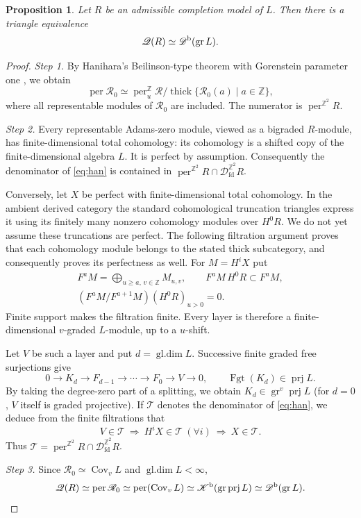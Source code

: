\documentclass[12pt,a4paper,english,reqno]{amsart}
\theoremstyle{plain}
\newtheorem{prp}[thm]{Proposition}
\theoremstyle{definition}
\numberwithin{equation}{section}
\def\prj{\operatorname{prj}}
\def\thick{\operatorname{thick}}
\def\Kb{{\mathcal K}^{\text{\rm b}}}
\def\Db{{\mathcal D}^{\text{\rm b}}}
\def\perf{\operatorname{per}}
\def\calD{{\mathcal D}}
\def\bbZ{{\mathbb Z}}
\def\Ds{\bigoplus}
\newcommand{\Fgt}{\operatorname{Fgt}}
\def\gr{\operatorname{gr}}
\def\Cov{\operatorname{Cov}}
\def\fd{\mathrm{fd}}
\begin{document}
\begin{prp}\label{prop:cover}
Let $R$ be an admissible completion model of $L$.
Then there is a triangle equivalence
\[
 \mathcal Q(R)\simeq\Db(\gr L).
\]
\end{prp}
\begin{proof}
\emph{Step 1.}
By Hanihara's Beilinson-type theorem with Gorenstein parameter one \cite[Theorem A.7]{Han}, we obtain
\begin{equation}\label{eq:han}
 \perf\mathcal R_0\simeq
 \perf^{\bbZ}_u\mathcal R/
 \thick\{\mathcal R_0(a)\mid a\in\bbZ\},
\end{equation}
where all representable modules of $\mathcal R_0$ are included. The numerator is $\perf^{\bbZ^2}R$. 

\medskip\noindent\emph{Step 2.}
Every representable Adams-zero module, viewed as a bigraded $R$-module, has finite-dimensional total cohomology: its cohomology is a shifted copy of the finite-dimensional algebra $L$. It is perfect by assumption. Consequently the denominator of \eqref{eq:han} is contained in $\perf^{\bbZ^2}R\cap\calD_{\fd}^{\bbZ^2}R$.

Conversely, let $X$ be perfect with finite-dimensional total cohomology. In the ambient derived category the standard cohomological truncation triangles express it using its finitely many nonzero cohomology modules over $H^0R$. We do not yet assume these truncations are perfect. The following filtration argument proves that each cohomology module belongs to the stated thick subcategory, and consequently proves its perfectness as well. For $M=H^iX$ put
\[
 \begin{gathered}
 F^aM=\Ds_{u\ge a,\,v\in\bbZ}M_{u,v},\qquad
 F^aM\,H^0R\subset F^aM,\\
 (F^aM/F^{a+1}M)(H^0R)_{u>0}=0.
 \end{gathered}
\]
Finite support makes the filtration finite. Every layer is therefore a finite-dimensional $v$-graded $L$-module, up to a $u$-shift.

Let $V$ be such a layer and put $d=\operatorname{gl.dim}L$. Successive finite graded free surjections give
\[
 0\longrightarrow K_d\longrightarrow F_{d-1}\longrightarrow\cdots
 \longrightarrow F_0\longrightarrow V\longrightarrow0,
 \qquad \Fgt(K_d)\in\prj L.
\]
By taking the degree-zero part of a splitting, we obtain $K_d\in\gr^v\prj L$ (for $d=0$, $V$ itself is graded projective). If $\mathcal T$ denotes the denominator of \eqref{eq:han}, we deduce from the finite filtrations that
\[
 V\in\mathcal T\ \Longrightarrow\ H^iX\in\mathcal T\ (\forall i)
 \ \Longrightarrow\ X\in\mathcal T.
\]
Thus $\mathcal T=\perf^{\bbZ^2}R\cap\calD_{\fd}^{\bbZ^2}R$.

\medskip\noindent\emph{Step 3.}
Since $\mathcal R_0\simeq\Cov_vL$ and $\operatorname{gl.dim}L<\infty$,
\[
 \mathcal Q(R)\simeq\perf\mathcal R_0
 \simeq\perf(\Cov_vL)
 \simeq\Kb(\gr\prj L)
 \simeq\Db(\gr L).
\]

\end{proof}
\end{document}
